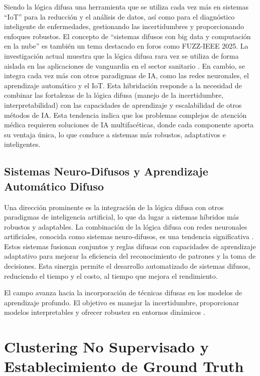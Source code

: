 Siendo la lógica difusa una herramienta que se utiliza cada vez más en sistemas ``IoT'' para la reducción y el análisis de datos, así como para el diagnóstico inteligente de enfermedades, gestionando las incertidumbres y proporcionando enfoques robustos. El concepto de ``sistemas difusos con big data y computación en la nube'' es también un tema destacado en foros como FUZZ-IEEE 2025. La investigación actual muestra que la lógica difusa rara vez se utiliza de forma aislada en las aplicaciones de vanguardia en el sector sanitario \citep{Alam2022Disease}. En cambio, se integra cada vez más con otros paradigmas de IA, como las redes neuronales, el aprendizaje automático y el IoT. Esta hibridación responde a la necesidad de combinar las fortalezas de la lógica difusa (manejo de la incertidumbre, interpretabilidad) con las capacidades de aprendizaje y escalabilidad de otros métodos de IA. Esta tendencia indica que los problemas complejos de atención médica requieren soluciones de IA multifacéticas, donde cada componente aporta su ventaja única, lo que conduce a sistemas más robustos, adaptativos e inteligentes.

\subsection{Sistemas Neuro-Difusos y Aprendizaje Automático Difuso}
\label{subsec:sistemas_neurodifusos}

Una dirección prominente es la integración de la lógica difusa con otros paradigmas de inteligencia artificial, lo que da lugar a sistemas híbridos más robustos y adaptables. La combinación de la lógica difusa con redes neuronales artificiales, conocida como sistemas neuro-difusos, es una tendencia significativa \citep{Alam2022Disease,Zakaria2023Fuzzy}. Estos sistemas fusionan conjuntos y reglas difusas con capacidades de aprendizaje adaptativo para mejorar la eficiencia del reconocimiento de patrones y la toma de decisiones. Esta sinergia permite el desarrollo automatizado de sistemas difusos, reduciendo el tiempo y el costo, al tiempo que mejora el rendimiento.

El campo avanza hacia la incorporación de técnicas difusas en los modelos de aprendizaje profundo. El objetivo es manejar la incertidumbre, proporcionar modelos interpretables y ofrecer robustez en entornos dinámicos \citep{Tsoukalas1997FuzzyControl,Shetty2018Medical,Zakaria2023Fuzzy}.

\section{Clustering No Supervisado y Establecimiento de Ground Truth}
\label{sec:clustering_ground_truth}


